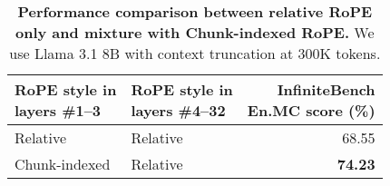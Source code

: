 \begin{table}[h]
\caption{\textbf{Performance comparison between relative RoPE only and mixture with Chunk-indexed RoPE.} We use Llama 3.1 8B with context truncation at 300K tokens.}
\label{tab:appendix_streaming_mix}
\vspace{1em}
\centering
\begin{tabular}{llr}
\toprule
\makecell[l]{RoPE style in\\ layers \#1--3} & 
\makecell[l]{RoPE style in\\ layers \#4--32} & 
\makecell[c]{InfiniteBench\\En.MC score (\%)} \\
\midrule
Relative & Relative & 68.55 \\
Chunk-indexed & Relative & \textbf{74.23} \\
\bottomrule
\end{tabular}
\end{table}